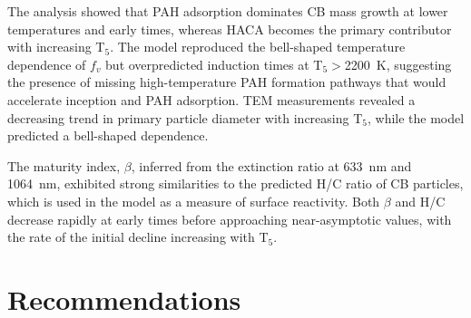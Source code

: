 The analysis showed that PAH adsorption dominates CB mass growth at lower temperatures and early times, whereas HACA becomes the primary contributor with increasing T$_5$. The model reproduced the bell-shaped temperature dependence of $f_v$ but overpredicted induction times at T$_5$$>$2200~K, suggesting the presence of missing high-temperature PAH formation pathways that would accelerate inception and PAH adsorption. TEM measurements revealed a decreasing trend in primary particle diameter with increasing T$_5$, while the model predicted a bell-shaped dependence.

The maturity index, $\beta$, inferred from the extinction ratio at 633~nm and 1064~nm, exhibited strong similarities to the predicted H/C ratio of CB particles, which is used in the model as a measure of surface reactivity. Both $\beta$ and H/C decrease rapidly at early times before approaching near-asymptotic values, with the rate of the initial decline increasing with T$_5$.


\section{Recommendations}

